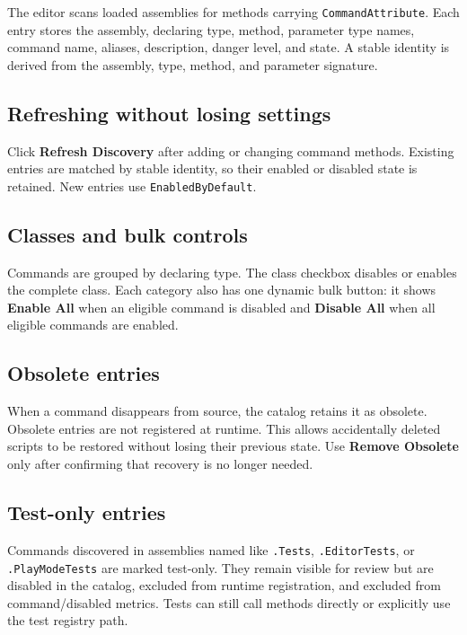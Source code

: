 \documentclass[11pt,a4paper]{article}
\begin{document}
The editor scans loaded assemblies for methods carrying \texttt{CommandAttribute}. Each entry stores the assembly, declaring type, method, parameter type names, command name, aliases, description, danger level, and state. A stable identity is derived from the assembly, type, method, and parameter signature.

\subsection{Refreshing without losing settings}

Click \textbf{Refresh Discovery} after adding or changing command methods. Existing entries are matched by stable identity, so their enabled or disabled state is retained. New entries use \texttt{EnabledByDefault}.

\subsection{Classes and bulk controls}

Commands are grouped by declaring type. The class checkbox disables or enables the complete class. Each category also has one dynamic bulk button: it shows \textbf{Enable All} when an eligible command is disabled and \textbf{Disable All} when all eligible commands are enabled.

\subsection{Obsolete entries}

When a command disappears from source, the catalog retains it as obsolete. Obsolete entries are not registered at runtime. This allows accidentally deleted scripts to be restored without losing their previous state. Use \textbf{Remove Obsolete} only after confirming that recovery is no longer needed.

\subsection{Test-only entries}

Commands discovered in assemblies named like \texttt{.Tests}, \texttt{.EditorTests}, or \texttt{.PlayModeTests} are marked test-only. They remain visible for review but are disabled in the catalog, excluded from runtime registration, and excluded from command/disabled metrics. Tests can still call methods directly or explicitly use the test registry path.
\end{document}
